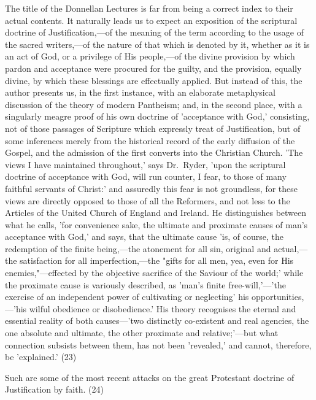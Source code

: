 \documentclass[
]{book}
\begin{document}
The title of the Donnellan Lectures is far from being a correct index to their actual contents. It naturally leads us to expect an exposition of the scriptural doctrine of Justification,---of the meaning of the term according to the usage of the sacred writers,---of the nature of that which is denoted by it, whether as it is an act of God, or a privilege of His people,---of the divine provision by which pardon and acceptance were procured for the guilty, and the provision, equally divine, by which these blessings are effectually applied. But instead of this, the author presents us, in the first instance, with an elaborate metaphysical discussion of the theory of modern Pantheism; and, in the second place, with a singularly meagre proof of his own doctrine of 'acceptance with God,' consisting, not of those passages of Scripture which expressly treat of Justification, but of some inferences merely from the historical record of the early diffusion of the Gospel, and the admission of the first converts into the Christian Church. 'The views I have maintained throughout,' says Dr.~Ryder, 'upon the scriptural doctrine of acceptance with God, will run counter, I fear, to those of many faithful servants of Christ:' and assuredly this fear is not groundless, for these views are directly opposed to those of all the Reformers, and not less to the Articles of the United Church of England and Ireland. He distinguishes between what he calls, 'for convenience sake, the ultimate and proximate causes of man's acceptance with God,' and says, that the ultimate cause 'is, of course, the redemption of the finite being,---the atonement for all sin, original and actual,---the satisfaction for all imperfection,---the "gifts for all men, yea, even for His enemies,"---effected by the objective sacrifice of the Saviour of the world;' while the proximate cause is variously described, as 'man's finite free-will,'---'the exercise of an independent power of cultivating or neglecting' his opportunities,---'his wilful obedience or disobedience.' His theory recognises the eternal and essential reality of both causes---'two distinctly co-existent and real agencies, the one absolute and ultimate, the other proximate and relative;'---but what connection subsists between them, has not been 'revealed,' and cannot, therefore, be 'explained.' (23)

Such are some of the most recent attacks on the great Protestant doctrine of Justification by faith. (24)
\end{document}

